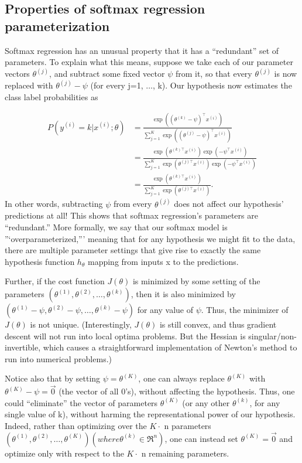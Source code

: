 \subsection{Properties of softmax regression parameterization}

Softmax regression has an unusual property that it has a “redundant” set of parameters. To explain what this means, suppose we take each of our parameter vectors $\theta^{(j)}$, and subtract some fixed vector $\psi$ from it, so that every $\theta^{(j)}$ is now replaced with $\theta^{(j)} - \psi$ (for every j=1, $\ldots$, k). Our hypothesis now estimates the class label probabilities as

\begin{align} 
P(y^{(i)} = k | x^{(i)} ; \theta) &= \frac{\exp((\theta^{(k)}-\psi)^\top x^{(i)})}{\sum_{j=1}^K \exp( (\theta^{(j)}-\psi)^\top x^{(i)})} \\ &= \frac{\exp(\theta^{(k)\top} x^{(i)}) \exp(-\psi^\top x^{(i)})}{\sum_{j=1}^K \exp(\theta^{(j)\top} x^{(i)}) \exp(-\psi^\top x^{(i)})} \\ &= \frac{\exp(\theta^{(k)\top} x^{(i)})}{\sum_{j=1}^K \exp(\theta^{(j)\top} x^{(i)})}. 
\end{align}
In other words, subtracting $\psi$ from every $\theta^{(j)}$ does not affect our hypothesis’ predictions at all! This shows that softmax regression’s parameters are “redundant.” More formally, we say that our softmax model is ”‘overparameterized,”’ meaning that for any hypothesis we might fit to the data, there are multiple parameter settings that give rise to exactly the same hypothesis function $h_\theta$ mapping from inputs x to the predictions.

Further, if the cost function $J(\theta)$ is minimized by some setting of the parameters $(\theta^{(1)}, \theta^{(2)},\ldots, \theta^{(k)})$, then it is also minimized by $(\theta^{(1)} - \psi, \theta^{(2)} - \psi,\ldots, \theta^{(k)} - \psi)$ for any value of $\psi$. Thus, the minimizer of $J(\theta)$ is not unique. (Interestingly, $J(\theta)$ is still convex, and thus gradient descent will not run into local optima problems. But the Hessian is singular/non-invertible, which causes a straightforward implementation of Newton’s method to run into numerical problems.)

Notice also that by setting $\psi = \theta^{(K)}$, one can always replace $\theta^{(K)}$ with $\theta^{(K)} - \psi = \vec{0}$ (the vector of all 0’s), without affecting the hypothesis. Thus, one could “eliminate” the vector of parameters $\theta^{(K)}$ (or any other $\theta^{(k)}$, for any single value of k), without harming the representational power of our hypothesis. Indeed, rather than optimizing over the $K\cdot$ n parameters $(\theta^{(1)}, \theta^{(2)},\ldots, \theta^{(K)}) (where \theta^{(k)} \in \Re^{n})$, one can instead set $\theta^{(K)} = \vec{0}$ and optimize only with respect to the $K \cdot$ n remaining parameters.

